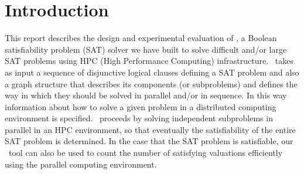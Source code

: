 \documentclass[
10pt, %
a4paper, %
oneside, %
headinclude,footinclude, %
BCOR5mm, %
]{scrartcl}
\begin{document}

\newpage %

\setcounter{tocdepth}{2} %
\tableofcontents %
\listoffigures %
\listoftables %

\newpage %








\section{Introduction}

This report describes the design and experimental evaluation of \dagster, a Boolean satisfiability problem (SAT) solver we have built to solve difficult and/or large SAT problems using HPC (High Performance Computing) infrastructure.
\dagster\ takes as input a sequence of disjunctive logical clauses defining a SAT problem and also a graph structure that describes its components (or subproblems) and defines the way in which they should be solved in parallel and/or in sequence. In this way information about how to solve a given problem in a distributed computing environment is specified.
\dagster\ proceeds by solving independent subproblems in parallel in an HPC environment, so that eventually the satisfiability of the entire SAT problem is determined.
In the case that the SAT problem is satisfiable, our \dagster\ tool can also be used to count the number of satisfying valuations efficiently using the parallel computing environment. 
\end{document}
